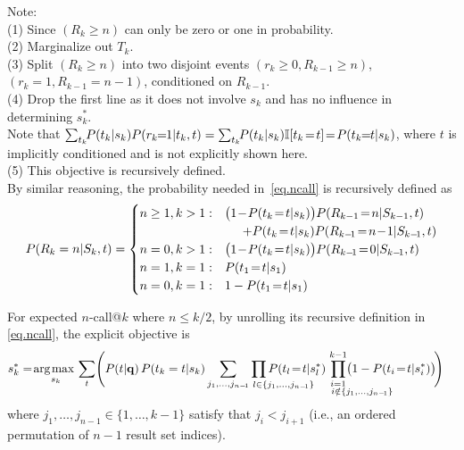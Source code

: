 \noindent
Note: \\
(1) Since $( R_k \geq n )$ can only be zero or one in probability. \\
(2) Marginalize out $T_k$. \\
(3) Split $( R_k \geq n )$ into two disjoint events $(r_k \! \geq \! 0, R_{k\!-\!1}\!\geq \!n)$, $(r_k\!=\!1, R_{k\!-\!1}\!=\!n\!-\!1)$, conditioned on $R_{k-1}$. \\
(4) Drop the first line as it does not involve $s_k$ and has no influence in determining $s_k^*$. \\
Note that $\sum_{t_k} \!\! P(t_k|s_k) P(r_k\!\!=\!\!1|t_k,t) = \sum_{t_k} \!\! P(t_k|s_k) \I[t_k\!=\!t] \! = \! P(t_k\!\!=\!\!t|s_k)$, where $t$ is implicitly conditioned and is not explicitly shown here. \\
(5) This objective is recursively defined. \\

By similar reasoning, the probability needed in~\eqref{eq.ncall} is recursively defined as
\begin{align*}
P(R_k=n|S_k,t)=
\begin{cases}
n \geq 1, k > 1:  &  \bigl( 1\!-\!P(t_k\!=\!t|s_k) \bigr) P(R_{k-1}\!=\!n|S_{k-1},t) \nonumber \\
  & \hspace{5mm} + P(t_k\!=\!t|s_k) P(R_{k-\!1}\!=\!n\!-\!1|S_{k-\!1},t) \\
n = 0, k > 1:   & \bigl( 1\!-\!P(t_k\!=\!t|s_k) \bigr) P(R_{k-\!1}\!=\!0|S_{k-\!1},t) \\
n = 1, k = 1:   & P(t_1\!=\!t|s_1) \\
n = 0, k = 1:   & 1 - P(t_1\!=\!t|s_1)
\end{cases}
\end{align*}

For expected $n$-call@$k$ where $n \! \leq \! k/2$, by unrolling its recursive definition in \eqref{eq.ncall}, the explicit objective is
\begin{align}
  & s_k^* = \argmax_{s_k} \sum_t \Biggl( P(t|\vec{q}) \, P(t_k=t|s_k) \sum_{j_1, \dots, j_{n-\!1}} \hspace{-14mm} \prod_{\hspace{14.5mm} l \in \{j_1, \dots, j_{n-\!1}\}} \hspace{-14mm} P(t_l\!=\!t|s_l^*) \hspace{-13mm} \prod_{\substack{i=1 \\ \hspace{14mm} i \notin \{j_1, \dots, j_{n-\!1}\}}}^{k-1} \hspace{-13mm} \!\bigl( 1 - P(t_i\!=\!t|s_i^*) \bigr) \!\Biggr) \label{eq.ncall.alt}
\end{align}
where $j_1, \dots, j_{n-1} \in \{1,\ldots,k-1\}$ satisfy 
that $j_i < j_{i+1}$ (i.e.,
an ordered permutation of $n-1$ result set indices). \\

